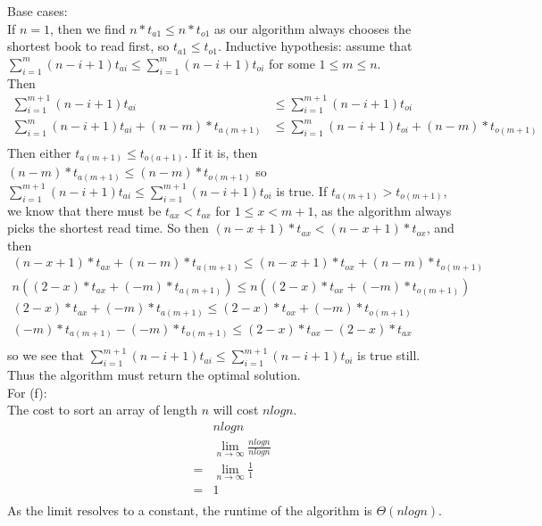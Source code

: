 \documentclass{assignment}
\begin{document}
\begin{problemlist}
\begin{answer}
Base cases:\\
If $n=1$, then we find $n*t_{a1} \le n*t_{o1}$ as our algorithm always chooses the shortest book to read first, so $t_{a1}\le t_{o1}$.
Inductive hypothesis: assume that $\sum_{i=1}^{m} (n-i+1)t_{ai}\le \sum_{i=1}^{m} (n-i+1)t_{oi}$ for some $1\le m\le n$.\\
Then 
\begin{align*}
\sum_{i=1}^{m+1} (n-i+1)t_{ai}&\le \sum_{i=1}^{m+1} (n-i+1)t_{oi}\\
\sum_{i=1}^{m} (n-i+1)t_{ai}+(n-m)*t_{a(m+1)} &\le \sum_{i=1}^{m} (n-i+1)t_{oi}+(n-m)*t_{o(m+1)}\\
\end{align*}
Then either $t_{a(m+1)}\le t_{o(a+1)}$. If it is, then $(n-m)*t_{a(m+1)} \le (n-m)*t_{o(m+1)}$ so $\sum_{i=1}^{m+1} (n-i+1)t_{ai} \le \sum_{i=1}^{m+1} (n-i+1)t_{oi}$ is true. If $t_{a(m+1)} > t_{o(m+1)}$, we know that there must be $t_{ax} < t_{ox}$ for $1\le x < m+1$, as the algorithm always picks the shortest read time. So then $(n-x+1)*t_{ax} < (n-x+1)*t_{ox}$, and then 
\begin{align*}
(n-x+1)*t_{ax} +(n-m)*t_{a(m+1)} \le (n-x+1)*t_{ox} + (n-m)*t_{o(m+1)}\\
n((2-x)*t_{ax}+(-m)*t_{a(m+1)}) \le n((2-x)*t_{ox}+(-m)*t_{o(m+1)})\\
(2-x)*t_{ax}+(-m)*t_{a(m+1)} \le (2-x)*t_{ox}+(-m)*t_{o(m+1)}\\
(-m)*t_{a(m+1)}-(-m)*t_{o(m+1)}\le (2-x)*t_{ox}-(2-x)*t_{ax}\\
\end{align*}
so we see that $\sum_{i=1}^{m+1} (n-i+1)t_{ai}\le \sum_{i=1}^{m+1} (n-i+1)t_{oi}$ is true still.\\
Thus the algorithm must return the optimal solution.\\
For (f):\\
The cost to sort an array of length $n$ will cost $nlogn$.\\
\begin{align*}
&nlogn\\
&\lim_{n\rightarrow \infty} \frac{nlogn}{nlogn}\\
=&\lim_{n\rightarrow \infty} \frac{1}{1}\\
=&1\\
\end{align*}
As the limit resolves to a constant, the runtime of the algorithm is $\Theta (nlogn)$.\\
\end{answer}
\clearpage
\pbitem
\begin{problem}

\end{problem}
\end{problemlist}
\end{document}
